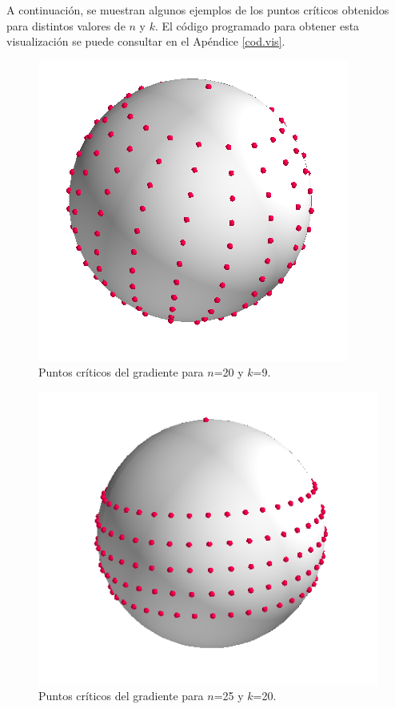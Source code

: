 A continuación, se muestran algunos ejemplos de los puntos críticos obtenidos para distintos valores de $n$ y $k$. El código programado para obtener esta visualización se puede consultar en el Apéndice \ref{cod.vis}.
\begin{figure}[H]
	\centering
	\includegraphics[scale=0.4]{img/gradient_20_9.png}
	\caption{Puntos críticos del gradiente para $n$=20 y $k$=9.}
\end{figure}

\begin{figure}[H]
	\centering
	\includegraphics[scale=0.5]{img/gradient_25_5.png}
	\caption{Puntos críticos del gradiente para $n$=25 y $k$=20.}
\end{figure}

